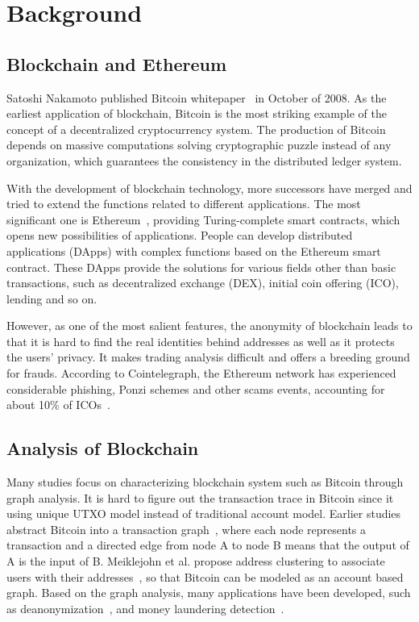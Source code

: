 
\section{Background}
\label{sec:background}
\subsection{Blockchain and Ethereum}
Satoshi Nakamoto published Bitcoin whitepaper~\cite{Nakamoto2008} in October of 2008. As the earliest application of blockchain, Bitcoin is the most striking example of the concept of a decentralized cryptocurrency system. The production of Bitcoin depends on massive computations solving cryptographic puzzle instead of any organization, which guarantees the consistency in the distributed ledger system.

With the development of blockchain technology, more successors have merged and tried to extend the functions related to different applications. The most significant one is Ethereum~\cite{buterin2013ethereum}, providing Turing-complete smart contracts, which opens new possibilities of applications. People can develop distributed applications (DApps) with complex functions based on the Ethereum smart contract. These DApps provide the solutions for various fields other than basic transactions, such as decentralized exchange (DEX), initial coin offering (ICO), lending and so on.

However, as one of the most salient features, the anonymity of blockchain leads to that it is hard to find the real identities behind addresses as well as it protects the users' privacy. It makes trading analysis difficult and offers a breeding ground for frauds. According to Cointelegraph, the Ethereum network has experienced considerable phishing, Ponzi schemes and other scams events, accounting for about 10\% of ICOs~\cite{cerchiello2018icos}.

\subsection{Analysis of Blockchain}
Many studies focus on characterizing blockchain system such as Bitcoin through graph analysis. It is hard to figure out the transaction trace in Bitcoin since it using unique UTXO model instead of traditional account model. Earlier studies abstract Bitcoin into a transaction graph~\cite{reid2013analysis}, where each node represents a transaction and a directed edge from node A to node B means that the output of A is the input of B. Meiklejohn et al. propose address clustering to associate users with their addresses~\cite{meiklejohn2013fistful}, so that Bitcoin can be modeled as an account based graph. Based on the graph analysis, many applications have been developed, such as deanonymization~\cite{reid2013analysis}, and money laundering detection~\cite{zhao2015graph,maesa2016analysis,ranshous2017exchange}. 

